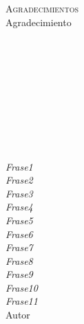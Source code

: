\textsc{\Large Agradecimientos}\\[0.5cm]




\thispagestyle{empty}
Agradecimiento\\\\\\\\\\\\\\\\\\\\




















\begin{flushright}
\textit{Frase1}\\
\textit{Frase2}\\
\textit{Frase3}\\
\textit{Frase4}\\
\textit{Frase5}\\
\textit{Frase6}\\
\textit{Frase7}\\
\textit{Frase8}\\ 


\textit{Frase9}\\
\textit{Frase10}\\
\textit{Frase11}\\ 


Autor
\end{flushright}

